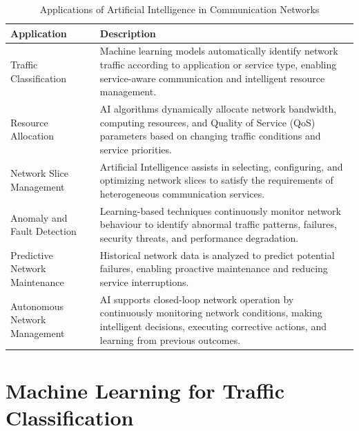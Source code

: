 \documentclass[12pt,a4paper]{report}
\begin{document}
	\begin{table}[H]
		\centering
		\caption{Applications of Artificial Intelligence in Communication Networks}
		\label{tab:ai_networking}
		
		\begin{tabular}{|p{5cm}|p{8cm}|}
			\hline
			
			\textbf{Application} &
			\textbf{Description}
			\\
			\hline
			
			Traffic Classification &
			Machine learning models automatically identify network traffic according to application or service type, enabling service-aware communication and intelligent resource management.
			\\
			\hline
			
			Resource Allocation &
			AI algorithms dynamically allocate network bandwidth, computing resources, and Quality of Service (QoS) parameters based on changing traffic conditions and service priorities.
			\\
			\hline
			
			Network Slice Management &
			Artificial Intelligence assists in selecting, configuring, and optimizing network slices to satisfy the requirements of heterogeneous communication services.
			\\
			\hline
			
			Anomaly and Fault Detection &
			Learning-based techniques continuously monitor network behaviour to identify abnormal traffic patterns, failures, security threats, and performance degradation.
			\\
			\hline
			
			Predictive Network Maintenance &
			Historical network data is analyzed to predict potential failures, enabling proactive maintenance and reducing service interruptions.
			\\
			\hline
			
			Autonomous Network Management &
			AI supports closed-loop network operation by continuously monitoring network conditions, making intelligent decisions, executing corrective actions, and learning from previous outcomes.
			\\
			\hline
			
		\end{tabular}
		
	\end{table}
	
	\section{Machine Learning for Traffic Classification}
	\label{sec:traffic_classification}
	
\end{document}
